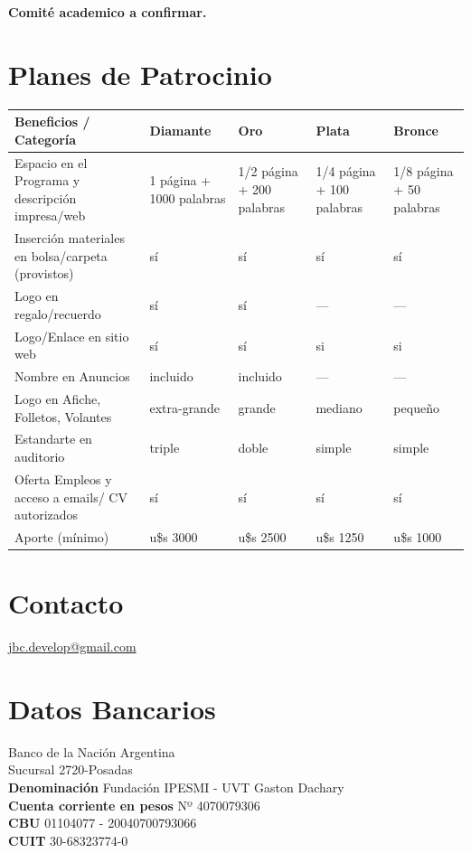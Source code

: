 \documentclass[11pt,a4paper]{report}
\begin{document}
\textbf{Comité academico a confirmar.}

\section*{Planes de Patrocinio}
\begin{center}

\begin{tabular}{|p{4cm}|p{2.5cm}|p{2.5cm}|p{2.5cm}|p{2.5cm}|}
\hline
Beneficios / Categoría & Diamante & Oro  & Plata & Bronce \\
\hline
Espacio en el Programa y descripción impresa/web & 1 página +
1000 palabras & 1/2 página + 200 palabras & 1/4 página + 100 palabras &  1/8 página + 50 palabras\\
\hline
Inserción materiales en bolsa/carpeta (provistos) & sí & sí & sí & sí \\
\hline
Logo en regalo/recuerdo & sí & sí & --- & --- \\
\hline
Logo/Enlace en sitio web & sí & sí & si & si \\
\hline
Nombre en Anuncios & incluido & incluido & --- & --- \\
\hline
Logo en Afiche, Folletos, Volantes & extra-grande & grande & mediano & pequeño \\
\hline
Estandarte en auditorio & triple & doble & simple & simple \\
\hline
Oferta Empleos y acceso a emails/ CV autorizados  & sí & sí & sí & sí \\
\hline
Aporte (mínimo) & u\$s 3000 & u\$s 2500 & u\$s 1250 & u\$s 1000\\
\hline
\end{tabular}
\end{center}

\section*{Contacto}
\noindent \href{mailto:jbc.develop@gmail.com}{jbc.develop@gmail.com}

\section*{Datos Bancarios}
\noindent Banco de la Nación Argentina \\
Sucursal 2720-Posadas \\
\textbf{Denominación} Fundación IPESMI - UVT Gaston Dachary \\
\textbf{Cuenta corriente en pesos} Nº 4070079306 \\
\textbf{CBU} 01104077 - 20040700793066 \\
\textbf{CUIT} 30-68323774-0 \\
\end{document}

